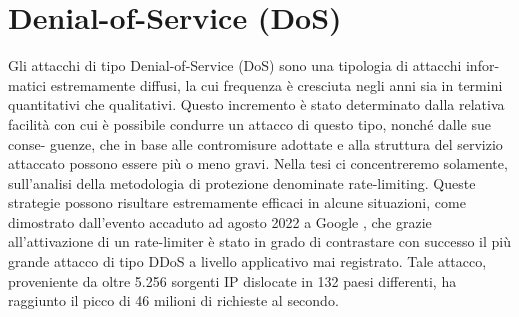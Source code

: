 \section{Denial-of-Service (DoS)}

Gli attacchi di tipo Denial-of-Service (DoS) sono una tipologia di attacchi infor- matici estremamente diffusi, la cui
frequenza è cresciuta negli anni sia in termini quantitativi che qualitativi. Questo incremento è stato determinato
dalla relativa facilità con cui è possibile condurre un attacco di questo tipo, nonché dalle sue conse- guenze, che in
base alle contromisure adottate e alla struttura del servizio attaccato possono essere più o meno gravi. Nella tesi ci
concentreremo solamente, sull’analisi della metodologia di protezione denominate rate-limiting. Queste strategie possono
risultare estremamente efficaci in alcune situazioni, come dimostrato dall’evento accaduto ad agosto 2022 a Google \cite{google_ddos},
che grazie all’attivazione di un rate-limiter è stato in grado di contrastare con successo il più grande attacco di tipo
DDoS a livello applicativo mai registrato. Tale attacco, proveniente da oltre 5.256 sorgenti IP dislocate in 132 paesi
differenti, ha raggiunto il picco di 46 milioni di richieste al secondo. 

